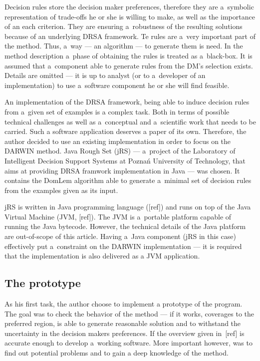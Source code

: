 Decision rules store the decision maker preferences, therefore they are
a~symbolic representation of trade-offs he or she is willing to make, as well
as the importance of an each criterion. They are ensuring a~robustness of the
resulting solutions because of an underlying DRSA framework. Te rules are
a~very important part of the method. Thus, a~way --- an algorithm --- to
generate them is need. In the method description a~phase of obtaining the
rules is treated as a~black-box. It is assumed that a~component able to
generate rules from the DM's selection exists. Details are omitted --- it is
up to analyst (or to a~developer of an implementation) to use a~software
component he or she will find feasible.

An implementation of the DRSA framework, being able to induce decision rules
from a~given set of examples is a complex task. Both in terms of possible
technical challenges as well as a~conceptual and a~scientific work that needs
to be carried. Such a software application deserves a paper of its
own. Therefore, the author decided to use an existing implementation in order
to focus on the DARWIN method. Java Rough Set (jRS) --- a~project of the
Laboratory of Intelligent Decision Support Systems at Poznań University of
Technology, that aims at providing DRSA framwork implementation in Java ---
was chosen. It contains the DomLem algorithm able to generate a~minimal set of
decision rules from the examples given as its input.

jRS is written in Java programming language ([ref]) and runs on top of the
Java Virtual Machine (JVM, [ref]). The JVM is a~portable platform capable of
running the Java bytecode. However, the technical details of the Java platform
are out-of-scope of this article. Having a~Java component (jRS in this case)
effectively put a~constraint on the DARWIN implementation --- it is required
that the implementation is also delivered as a JVM application.

\subsection{The prototype}

As his first task, the author choose to implement a prototype of the
program. The goal was to check the behavior of the method --- if it works,
coverages to the preferred region, is able to generate reasonable solution and
to withstand the uncertainty in the decision makers preferences. If the
overview given in~[ref] is accurate enough to develop a~working software. More
important however, was to find out potential problems and to gain a deep
knowledge of the method.

